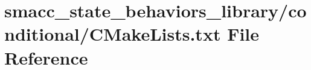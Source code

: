 \hypertarget{state__behaviors__library_2conditional_2CMakeLists_8txt}{}\section{smacc\+\_\+state\+\_\+behaviors\+\_\+library/conditional/\+C\+Make\+Lists.txt File Reference}
\label{state__behaviors__library_2conditional_2CMakeLists_8txt}
